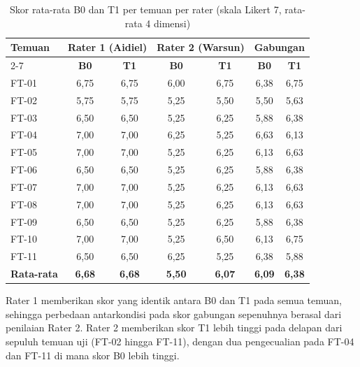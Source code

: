 \begin{table}[h]
\caption{Skor rata-rata B0 dan T1 per temuan per rater (skala Likert 7, rata-rata 4 dimensi)}
\vspace{0.5em}
\centering
\label{tab:validasi-skor-per-temuan}
\begin{tabular}{|l|c|c|c|c|c|c|}
\hline
\multirow{2}{*}{\textbf{Temuan}} &
  \multicolumn{2}{c|}{\textbf{Rater 1 (Aidiel)}} &
  \multicolumn{2}{c|}{\textbf{Rater 2 (Warsun)}} &
  \multicolumn{2}{c|}{\textbf{Gabungan}} \\
\cline{2-7}
 & \textbf{B0} & \textbf{T1} & \textbf{B0} & \textbf{T1} &
   \textbf{B0} & \textbf{T1} \\
\hline \hline
FT-01 & 6{,}75 & 6{,}75 & 6{,}00 & 6{,}75 & 6{,}38 & 6{,}75 \\
\hline
FT-02 & 5{,}75 & 5{,}75 & 5{,}25 & 5{,}50 & 5{,}50 & 5{,}63 \\
\hline
FT-03 & 6{,}50 & 6{,}50 & 5{,}25 & 6{,}25 & 5{,}88 & 6{,}38 \\
\hline
FT-04 & 7{,}00 & 7{,}00 & 6{,}25 & 5{,}25 & 6{,}63 & 6{,}13 \\
\hline
FT-05 & 7{,}00 & 7{,}00 & 5{,}25 & 6{,}25 & 6{,}13 & 6{,}63 \\
\hline
FT-06 & 6{,}50 & 6{,}50 & 5{,}25 & 6{,}25 & 5{,}88 & 6{,}38 \\
\hline
FT-07 & 7{,}00 & 7{,}00 & 5{,}25 & 6{,}25 & 6{,}13 & 6{,}63 \\
\hline
FT-08 & 7{,}00 & 7{,}00 & 5{,}25 & 6{,}25 & 6{,}13 & 6{,}63 \\
\hline
FT-09 & 6{,}50 & 6{,}50 & 5{,}25 & 6{,}25 & 5{,}88 & 6{,}38 \\
\hline
FT-10 & 7{,}00 & 7{,}00 & 5{,}25 & 6{,}50 & 6{,}13 & 6{,}75 \\
\hline
FT-11 & 6{,}50 & 6{,}50 & 6{,}25 & 5{,}25 & 6{,}38 & 5{,}88 \\
\hline
\textbf{Rata-rata} &
  \textbf{6{,}68} & \textbf{6{,}68} &
  \textbf{5{,}50} & \textbf{6{,}07} &
  \textbf{6{,}09} & \textbf{6{,}38} \\
\hline
\end{tabular}
\end{table}

Rater 1 memberikan skor yang identik antara B0 dan T1 pada semua
temuan, sehingga perbedaan antarkondisi pada skor gabungan
sepenuhnya berasal dari penilaian Rater 2. Rater 2 memberikan skor
T1 lebih tinggi pada delapan dari sepuluh temuan uji (FT-02 hingga
FT-11), dengan dua pengecualian pada FT-04 dan FT-11 di mana skor
B0 lebih tinggi.

